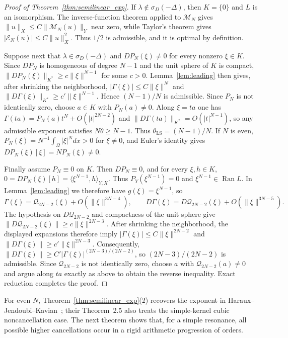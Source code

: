 \documentclass[11pt]{article}
\theoremstyle{definition}
\theoremstyle{remark}
\begin{document}
\begin{proof}[Proof of Theorem~\ref{thm:semilinear_exp}]
If $\lambda\notin\sigma_D(-\Delta)$, then $K=\{0\}$ and $L$ is an isomorphism. The inverse-function theorem applied to $\mathcal M_N$ gives $\|u\|_X\le C\|\mathcal M_N(u)\|_Y$ near zero, while Taylor's theorem gives $|\mathcal E_N(u)|\le C\|u\|_X^2$. Thus $1/2$ is admissible, and it is optimal by definition.

Suppose next that $\lambda\in\sigma_D(-\Delta)$ and $DP_N(\xi)\ne0$ for every nonzero $\xi\in K$. Since $DP_N$ is homogeneous of degree $N-1$ and the unit sphere of $K$ is compact, $\|DP_N(\xi)\|_{K^*}\ge c\|\xi\|^{N-1}$ for some $c>0$. Lemma~\ref{lem:leading} then gives, after shrinking the neighborhood, $|\Gamma(\xi)|\le C\|\xi\|^N$ and $\|D\Gamma(\xi)\|_{K^*}\ge c'\|\xi\|^{N-1}$. Hence $(N-1)/N$ is admissible. Since $P_N$ is not identically zero, choose $a\in K$ with $P_N(a)\ne0$. Along $\xi=ta$ one has $\Gamma(ta)=P_N(a)t^N+O(|t|^{2N-2})$ and $\|D\Gamma(ta)\|_{K^*}=O(|t|^{N-1})$, so any admissible exponent satisfies $N\theta\ge N-1$. Thus $\theta_{\mathrm{LS}}=(N-1)/N$. If $N$ is even, $P_N(\xi)=N^{-1}\int_\Omega|\xi|^Ndx>0$ for $\xi\ne0$, and Euler's identity gives $DP_N(\xi)[\xi]=NP_N(\xi)\ne0$.

Finally assume $P_N\equiv0$ on $K$. Then $DP_N\equiv0$, and for every $\xi,h\in K$,
$0=DP_N(\xi)[h]=\langle\xi^{N-1},h\rangle_{Y,X}$. Thus $P_Y(\xi^{N-1})=0$ and $\xi^{N-1}\in\operatorname{Ran}L$. In Lemma~\ref{lem:leading} we therefore have $g(\xi)=\xi^{N-1}$, so
$$
\Gamma(\xi)=\mathcal Q_{2N-2}(\xi)+O(\|\xi\|^{3N-4}),
\qquad
D\Gamma(\xi)=D\mathcal Q_{2N-2}(\xi)+O(\|\xi\|^{3N-5}).
$$
The hypothesis on $D\mathcal Q_{2N-2}$ and compactness of the unit sphere give $\|D\mathcal Q_{2N-2}(\xi)\|\ge c\|\xi\|^{2N-3}$. After shrinking the neighborhood, the displayed expansions therefore imply
$|\Gamma(\xi)|\le C\|\xi\|^{2N-2}$ and $\|D\Gamma(\xi)\|\ge c'\|\xi\|^{2N-3}$. Consequently,
$\|D\Gamma(\xi)\|\ge C'|\Gamma(\xi)|^{(2N-3)/(2N-2)}$, so $(2N-3)/(2N-2)$ is admissible. Since $\mathcal Q_{2N-2}$ is not identically zero, choose $a$ with $\mathcal Q_{2N-2}(a)\ne0$ and argue along $ta$ exactly as above to obtain the reverse inequality. Exact reduction completes the proof.
\end{proof}

For even $N$, Theorem~\ref{thm:semilinear_exp}(2) recovers the exponent in Haraux--Jendoubi--Kavian~\cite[Theorem~2.2]{HarauxJendoubiKavian2003}; their Theorem~2.5 also treats the simple-kernel cubic noncancellation case. The next theorem shows that, for a simple resonance, all possible higher cancellations occur in a rigid arithmetic progression of orders.
\end{document}
